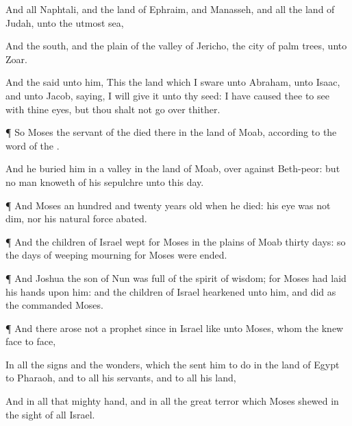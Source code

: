 {And all
Naphtali, and the
land of
Ephraim, and
Manasseh, and all the
land of
Judah, unto the
utmost
sea,

And the
south, and the
plain of the
valley of
Jericho, the
city of palm
trees, unto
Zoar.

And the
{}
said unto him, This
{} the
land which I
sware unto
Abraham, unto
Isaac, and unto
Jacob,
saying, I will
give it unto thy
seed: I have caused thee to
see
{} with thine
eyes, but thou shalt not go
over thither.


\par }{\PP {}¶ So
Moses the
servant of the
{}
died there in the
land of
Moab, according to the
word of the
{}.

And he
buried him in a
valley in the
land of
Moab, over
against
Beth-peor: but no
man
knoweth of his
sepulchre unto this
day.


\par }{\PP {}¶ And
Moses
{} an
hundred and
twenty
years
old when he
died: his
eye was not
dim, nor his natural
force
abated.


\par }{\PP {}¶ And the
children of
Israel
wept for
Moses in the
plains of
Moab
thirty
days: so the
days of
weeping
{}
mourning for
Moses were
ended.


\par }{\PP {}¶ And
Joshua the
son of
Nun was
full of the
spirit of
wisdom; for
Moses had
laid his
hands upon him: and the
children of
Israel
hearkened unto him, and
did as the
{}
commanded
Moses.


\par }{\PP {}¶ And there
arose not a
prophet
since in
Israel like unto
Moses, whom the
{}
knew
face to
face,

In all the
signs and the
wonders, which the
{}
sent him to
do in the
land of
Egypt to
Pharaoh, and to all his
servants, and to all his
land,

And in all that
mighty
hand, and in all the
great
terror which
Moses
shewed in the
sight of all
Israel.


\par }